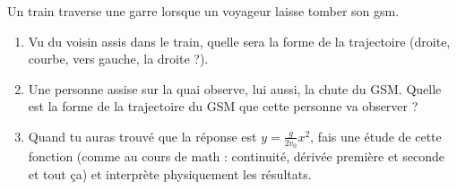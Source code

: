 \begin{exercice}  \label{exo:mouv2}\label{exo003}
Un train traverse une garre lorsque un voyageur laisse tomber son gsm.
\begin{enumerate}
\item Vu du voisin assis dans le train, quelle sera la forme de la trajectoire (droite, courbe, vers gauche, la droite ?).
\item Une personne assise sur la quai observe, lui aussi, la chute du GSM. Quelle est la forme de la trajectoire du GSM que cette personne va observer ?
\item Quand tu auras trouvé que la réponse est $y=\frac{ g }{ 2v_0 }x^2$, fais une étude de cette fonction (comme au cours de math : continuité, dérivée première et seconde et tout ça) et interprète physiquement les résultats.
\end{enumerate}
\end{exercice}


